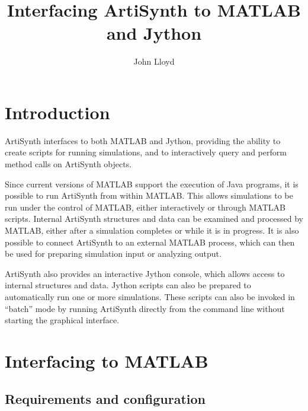 \documentclass{article}
\begin{document}
\setcounter{tocdepth}{5}
\setcounter{secnumdepth}{3}

\title{Interfacing ArtiSynth to MATLAB and Jython}
\author{John Lloyd}

\iflatexml
\date{}
\fi

\maketitle

\iflatexml{\large\pubdate}\fi

\tableofcontents


\section{Introduction}

ArtiSynth interfaces to both MATLAB and Jython, providing the ability
to create scripts for running simulations, and to interactively query
and perform method calls on ArtiSynth objects.

Since current versions of MATLAB support the execution of Java
programs, it is possible to run ArtiSynth from within MATLAB.  This
allows simulations to be run under the control of MATLAB, either
interactively or through MATLAB scripts. Internal ArtiSynth structures
and data can be examined and processed by MATLAB, either after a
simulation completes or while it is in progress. It is also possible
to connect ArtiSynth to an external MATLAB process, which can then be
used for preparing simulation input or analyzing output.

ArtiSynth also provides an interactive Jython console, which allows
access to internal structures and data. Jython scripts can also be
prepared to automatically run one or more simulations. These scripts
can also be invoked in ``batch'' mode by running ArtiSynth directly
from the command line without starting the graphical interface.

\section{Interfacing to MATLAB}

\subsection{Requirements and configuration}
\label{Requirements:sec}
\end{document}
